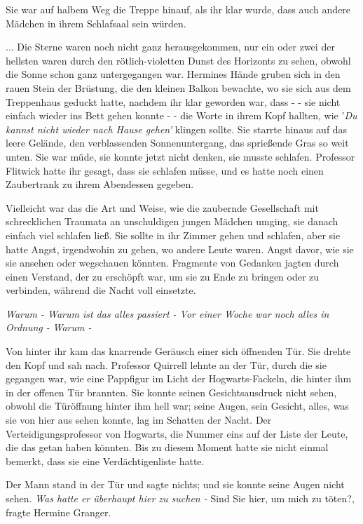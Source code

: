 Sie war auf halbem Weg die Treppe hinauf, als ihr klar wurde, dass auch andere
Mädchen in ihrem Schlafsaal sein würden.

... Die Sterne waren noch nicht ganz herausgekommen, nur ein oder zwei der
hellsten waren durch den rötlich-violetten Dunst des Horizonts zu sehen, obwohl
die Sonne schon ganz untergegangen war. Hermines Hände gruben sich in den rauen
Stein der Brüstung, die den kleinen Balkon bewachte, wo sie sich aus dem
Treppenhaus geduckt hatte, nachdem ihr klar geworden war, dass - - sie nicht
einfach wieder ins Bett gehen konnte - - die Worte in ihrem Kopf hallten, wie
'\emph{Du kannst nicht wieder nach Hause gehen' }klingen sollte. Sie starrte
hinaus auf das leere Gelände, den verblassenden Sonnenuntergang, das sprießende
Gras so weit unten. Sie war müde, sie konnte jetzt nicht denken, sie musste
schlafen. Professor Flitwick hatte ihr gesagt, dass sie schlafen müsse, und es
hatte noch einen Zaubertrank zu ihrem Abendessen gegeben.

Vielleicht war das die Art und Weise, wie die zaubernde Gesellschaft mit
schrecklichen Traumata an unschuldigen jungen Mädchen umging, sie danach einfach
viel schlafen ließ. Sie sollte in ihr Zimmer gehen und schlafen, aber sie hatte
Angst, irgendwohin zu gehen, wo andere Leute waren. Angst davor, wie sie sie
ansehen oder wegschauen könnten. Fragmente von Gedanken jagten durch einen
Verstand, der zu erschöpft war, um sie zu Ende zu bringen oder zu verbinden,
während die Nacht voll einsetzte.

\emph{Warum - Warum ist das alles passiert - Vor einer Woche war noch alles in
Ordnung - }\emph{Warum - }

Von hinter ihr kam das knarrende Geräusch einer sich öffnenden Tür. Sie drehte
den Kopf und sah nach. Professor Quirrell lehnte an der Tür, durch die sie
gegangen war, wie eine Pappfigur im Licht der Hogwarts-Fackeln, die hinter ihm
in der offenen Tür brannten. Sie konnte seinen Gesichtsausdruck nicht sehen,
obwohl die Türöffnung hinter ihm hell war; seine Augen, sein Gesicht, alles, was
sie von hier aus sehen konnte, lag im Schatten der Nacht. Der
Verteidigungsprofessor von Hogwarts, die Nummer eins auf der Liste der Leute,
die das getan haben könnten. Bis zu diesem Moment hatte sie nicht einmal
bemerkt, dass sie eine Verdächtigenliste hatte.

Der Mann stand in der Tür und sagte nichts; und sie konnte seine Augen nicht
sehen. \emph{Was hatte er überhaupt hier zu suchen -} \glqq Sind Sie hier, um
mich zu töten?\grqq{}, fragte Hermine Granger.

